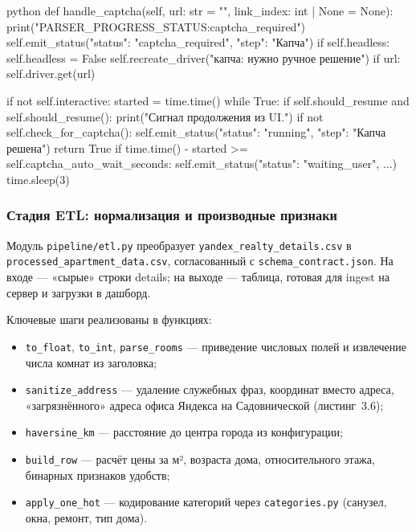 \begin{singleminted}{python}
def handle_captcha(self, url: str = "", link_index: int | None = None):
    print("PARSER_PROGRESS_STATUS:captcha_required")
    self.emit_status({"status": "captcha_required", "step": "Капча"})
    if self.headless:
        self.headless = False
        self.recreate_driver("капча: нужно ручное решение")
        if url:
            self.driver.get(url)

    if not self.interactive:
        started = time.time()
        while True:
            if self.should_resume and self.should_resume():
                print("Сигнал продолжения из UI.")
            if not self.check_for_captcha():
                self.emit_status({"status": "running", "step": "Капча решена"})
                return True
            if time.time() - started >= self.captcha_auto_wait_seconds:
                self.emit_status({"status": "waiting_user", ...})
            time.sleep(3)
\end{singleminted}
\label{lst:captcha-handle}

\subsubsection{Стадия ETL: нормализация и производные признаки}

Модуль \texttt{pipeline/etl.py} преобразует \texttt{yandex\_realty\_details.csv} в \texttt{processed\_apartment\_data.csv}, согласованный с \texttt{schema\_contract.json}. На входе --- «сырые» строки details; на выходе --- таблица, готовая для ingest на сервер и загрузки в дашборд.

Ключевые шаги реализованы в функциях:
\begin{itemize}
    \item \texttt{to\_float}, \texttt{to\_int}, \texttt{parse\_rooms} --- приведение числовых полей и извлечение числа комнат из заголовка;
    \item \texttt{sanitize\_address} --- удаление служебных фраз, координат вместо адреса, «загрязнённого» адреса офиса Яндекса на Садовнической (листинг~3.6);
    \item \texttt{haversine\_km} --- расстояние до центра города из конфигурации;
    \item \texttt{build\_row} --- расчёт цены за м², возраста дома, относительного этажа, бинарных признаков удобств;
    \item \texttt{apply\_one\_hot} --- кодирование категорий через \texttt{categories.py} (санузел, окна, ремонт, тип дома).
\end{itemize}

